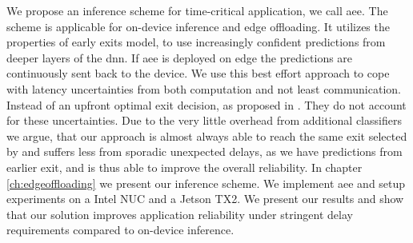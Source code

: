 We propose an inference scheme for time-critical application, we call \gls{aee}. The scheme is applicable for on-device inference and edge offloading. It utilizes the properties of early exits model, to use increasingly confident predictions from deeper layers of the \gls{dnn}. If \gls{aee} is deployed on edge the predictions are continuously sent back to the device. We use this best effort approach to cope with latency uncertainties from both computation and not least communication. Instead of an upfront optimal exit decision, as proposed in \cite{li_edge_2018}. They do not account for these uncertainties. Due to the very little overhead from additional classifiers we argue, that our approach is almost always able to reach the same exit selected by \cite{li_edge_2018} and suffers less from sporadic unexpected delays, as we have predictions from earlier exit, and is thus able to improve the overall reliability. In chapter \ref{ch:edgeoffloading} we present our inference scheme. We implement \gls{aee} and setup experiments on a Intel NUC and a Jetson TX2. We present our results and show that our solution improves application reliability under stringent delay requirements compared to on-device inference.